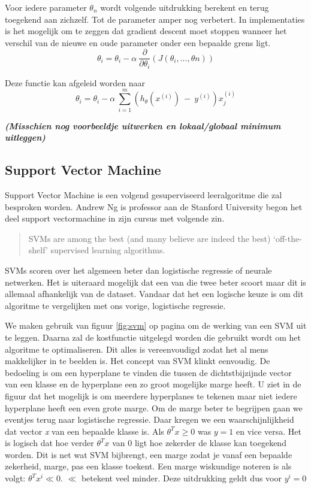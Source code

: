Voor iedere parameter $\theta_{n}$ wordt volgende uitdrukking berekent en terug toegekend aan zichzelf. Tot de parameter amper nog verbetert. In implementaties is het mogelijk om te zeggen dat gradient descent moet stoppen wanneer het verschil van de nieuwe en oude parameter onder een bepaalde grens ligt. 
$$
\theta_{i} = \theta_{i} - \alpha\:\frac{\partial}{\partial\theta_{i}}(J(\theta_{i}, ... , \theta{n}))
$$

Deze functie kan afgeleid worden naar 
$$
\theta_{i} = \theta_{i} - \alpha\:\sum_{i=1}^{m}(h_{\theta}(x^{(i)})\:-\:y^{(i)} ) x_{j}^{(i) }
$$

\textbf{\textit{(Misschien nog voorbeeldje uitwerken en lokaal/globaal minimum uitleggen)}}


\subsection{Support Vector Machine}
\label{sec:Support-Vector-Machine}
Support Vector Machine is een volgend gesuperviseerd leeralgoritme die zal besproken worden. 
Andrew Ng is professor aan de Stanford University begon het deel support vectormachine in zijn cursus \autocite{cursusAndrewNg} met volgende zin.
\begin{quote}
	SVMs are among the best (and many believe are indeed the best) ‘off-the-shelf’ supervised learning algorithms.
\end{quote}

SVMs scoren over het algemeen beter dan logistische regressie of neurale netwerken. Het is uiteraard mogelijk dat een van die twee beter scoort maar dit is allemaal afhankelijk van de dataset. Vandaar dat het een logische keuze is om dit algoritme te vergelijken met ons vorige, logistische regressie. 

We maken gebruik van figuur \ref{fig:svm} op pagina \pageref{fig:svm} om de werking van een SVM uit te leggen. Daarna zal de kostfunctie uitgelegd worden die gebruikt wordt om het algoritme te optimaliseren. Dit alles is vereenvoudigd zodat het al mens makkelijker in te beelden is.
Het concept van SVM klinkt eenvoudig. De bedoeling is om een hyperplane te vinden die tussen de dichtstbijzijnde vector van een klasse en de hyperplane een zo groot mogelijke marge heeft. U ziet in de figuur dat het mogelijk is om meerdere hyperplanes te tekenen maar niet iedere hyperplane heeft een even grote marge. Om de marge beter te begrijpen gaan we eventjes terug naar logistische regressie. Daar kregen we een waarschijnlijkheid dat vector \textit{x} van een bepaalde klasse is. Als $\theta^{T}x \geq 0$ was $y=1$ en vice versa. Het is logisch dat hoe verder $\theta^{T}x$ van 0 ligt hoe zekerder de klasse kan toegekend worden. Dit is net wat SVM bijbrengt, een marge zodat je vanaf een bepaalde zekerheid, marge, pas een klasse toekent. Een marge wiskundige noteren is als volgt: $\theta^{T}x^{i} \ll 0$. $\ll$ betekent veel minder. Deze uitdrukking geldt dus voor $y^{i}=0$
 
